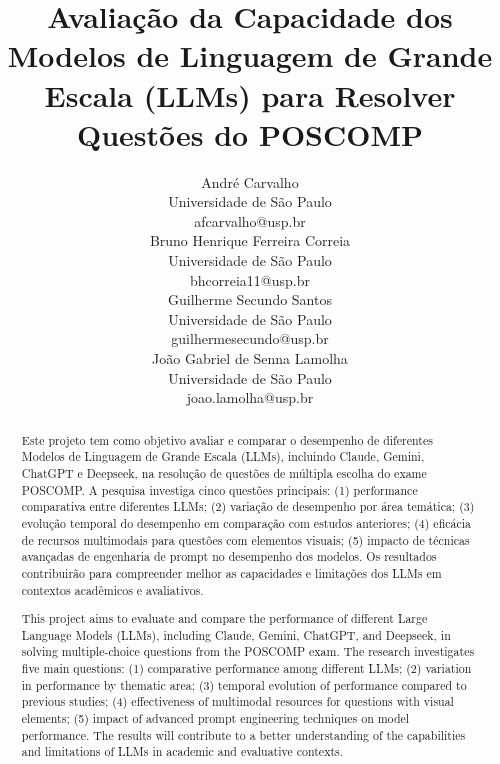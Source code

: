 \documentclass[brazilian, spanish, english]{RBIEarticle}
\title{Avaliação da Capacidade dos Modelos de Linguagem de Grande Escala (LLMs) para Resolver Questões do POSCOMP}
\author{%
    \parbox{6cm}{%
        André Carvalho\\
        Universidade de São Paulo\\
        afcarvalho@usp.br
    }
    \parbox{6cm}{%
        Bruno Henrique Ferreira Correia\\
        Universidade de São Paulo\\
        bhcorreia11@usp.br
    }
    \parbox{6cm}{%
        Guilherme Secundo Santos\\
        Universidade de São Paulo\\
        guilhermesecundo@usp.br
    }
    \parbox{6cm}{%
        João Gabriel de Senna Lamolha\\
        Universidade de São Paulo\\
        joao.lamolha@usp.br 
    }
}
\begin{document}
\maketitle

\begin{otherlanguage}{brazilian}
\begin{abstract}
Este projeto tem como objetivo avaliar e comparar o desempenho de diferentes Modelos de Linguagem de Grande Escala (LLMs), incluindo Claude, Gemini, ChatGPT e Deepseek, na resolução de questões de múltipla escolha do exame POSCOMP. A pesquisa investiga cinco questões principais: (1) performance comparativa entre diferentes LLMs; (2) variação de desempenho por área temática; (3) evolução temporal do desempenho em comparação com estudos anteriores; (4) eficácia de recursos multimodais para questões com elementos visuais; (5) impacto de técnicas avançadas de engenharia de prompt no desempenho dos modelos. Os resultados contribuirão para compreender melhor as capacidades e limitações dos LLMs em contextos acadêmicos e avaliativos.
\end{abstract}
\end{otherlanguage}

\begin{otherlanguage}{english}
\begin{abstract}
This project aims to evaluate and compare the performance of different Large Language Models (LLMs), including Claude, Gemini, ChatGPT, and Deepseek, in solving multiple-choice questions from the POSCOMP exam. The research investigates five main questions: (1) comparative performance among different LLMs; (2) variation in performance by thematic area; (3) temporal evolution of performance compared to previous studies; (4) effectiveness of multimodal resources for questions with visual elements; (5) impact of advanced prompt engineering techniques on model performance. The results will contribute to a better understanding of the capabilities and limitations of LLMs in academic and evaluative contexts.
\end{abstract}
\end{otherlanguage}
\end{document}
